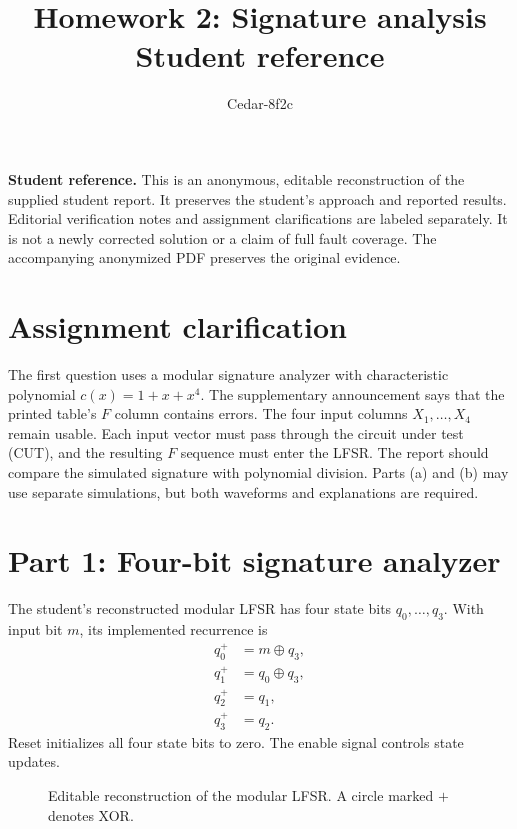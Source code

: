 \documentclass[11pt,a4paper]{article}
\title{Homework 2: Signature analysis\\Student reference}
\author{Cedar-8f2c}
\date{}
\newcommand{\reference}{\noindent\textbf{Student reference.} This is an anonymous, editable reconstruction of the supplied student report. It preserves the student's approach and reported results. Editorial verification notes and assignment clarifications are labeled separately. It is not a newly corrected solution or a claim of full fault coverage. The accompanying anonymized PDF preserves the original evidence.\par}
\begin{document}
\maketitle
\reference

\section{Assignment clarification}
The first question uses a modular signature analyzer with characteristic polynomial $c(x)=1+x+x^4$.
The supplementary announcement says that the printed table's $F$ column contains errors. The four input columns $X_1,\ldots,X_4$ remain usable. Each input vector must pass through the circuit under test (CUT), and the resulting $F$ sequence must enter the LFSR. The report should compare the simulated signature with polynomial division. Parts (a) and (b) may use separate simulations, but both waveforms and explanations are required.

\section{Part 1: Four-bit signature analyzer}
The student's reconstructed modular LFSR has four state bits $q_0,\ldots,q_3$. With input bit $m$, its implemented recurrence is
\begin{align*}
q_0^+&=m\oplus q_3,\\
q_1^+&=q_0\oplus q_3,\\
q_2^+&=q_1,\\
q_3^+&=q_2.
\end{align*}
Reset initializes all four state bits to zero. The enable signal controls state updates.
\begin{figure}[ht]\centering
{}
\caption{Editable reconstruction of the modular LFSR. A circle marked $+$ denotes XOR.}
\end{figure}
\end{document}
